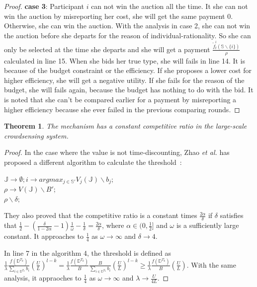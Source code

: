 \documentclass[conference,compsocconf,letterpaper,10pt]{IEEEtran}
\newtheorem{theorem}{Theorem}
\newcommand{\et}{{\em et al. }}
\begin{document}
\begin{proof}
\textbf{case 3}: Participant $i$ can not win the auction all the time. It she can not win the auction by misreporting her cost, she will get the same payment 0. Otherwise, she can win the auction. With the analysis in case 2, she can not win the auction before she departs for the reason of individual-rationality. So she can only be selected at the time she departs and she will get a payment $\frac{\tilde{f}^{i}_t(\mathbb{S}\backslash\{{i}\})}{\rho}$ calculated in line 15. When she bids her true type, she will fails in line 14. It is because of the budget constraint or the efficiency. If she proposes a lower cost for higher efficiency, she will get a negative utility. If she fails for the reason of the budget, she will fails again, because the budget has nothing to do with the bid. It is noted that she can't be compared earlier for a payment by misreporting a higher efficiency because she ever failed in the previous comparing rounds.
\end{proof}

\begin{theorem}
The mechanism has a constant competitive ratio in the large-scale crowdsensing system.
\end{theorem}
\begin{proof}
In the case where the value is not time-discounting, Zhao \et has proposed a different algorithm to calculate the threshold~\cite{zhao2014crowdsource}:

\begin{algorithm}
\BlankLine
{}
\caption{}
\label{alg:GetThreshold}
\begin{small}
\BlankLine
$\mathbb{J}\rightarrow\emptyset; i\rightarrow argmax_{j\in\mathbb{S}'}V_j(\mathbb{J})\backslash b_j$;\\

$\rho\rightarrow V(\mathbb{J})\backslash B'$;\\
\Return $\rho\backslash \delta;$
\end{small}
\end{algorithm}
They also proved that the competitive ratio is a constant times $\frac{2\alpha}{\delta}$ if $\delta$ satisfies that $\frac{1}{2}-(\frac{\delta}{1-2\alpha}-1)\frac{1}{\omega}-\frac{1}{\delta}=\frac{2\alpha}{\delta}$, where $\alpha\in(0,\frac{1}{2}]$ and $\omega$ is a sufficiently large constant. It approaches to $\frac{1}{4}$ as $\omega\to\infty$ and $\delta\to4$.

In line 7 in the algorithm 4, the threshold is defined as $\frac{1}{\lambda}\frac{f(\mathbb{D}^{T_k})}{\sum_{i\in\mathbb{D}^{T_k}}b_i}\left(\frac{U}{L}\right)^{l-k}=\frac{1}{\lambda}\frac{f(\mathbb{D}^{T_k})}{B}\frac{B}{\sum_{i\in\mathbb{D}^{T_k}}b_i}\left(\frac{U}{L}\right)^{l-k}\ge\frac{1}{\lambda}\frac{f(\mathbb{D}^{T_k})}{B}\left(\frac{U}{L}\right)$. With the same analysis, it appraoches to $\frac{1}{4}$ as $\omega\to\infty$ and $\lambda\to\frac{U}{4L}$.
\end{proof}
\end{document}
